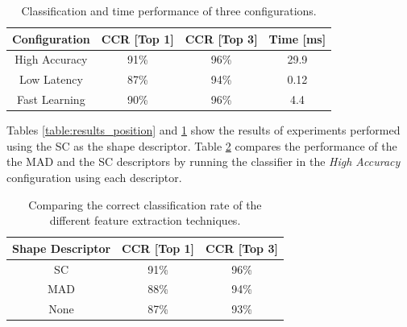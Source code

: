 \begin{table}
\centering
\renewcommand{\arraystretch}{1.2}
\begin{tabular}{ | c | c | c | c |}
  \hline
  \textbf{Configuration}  & \textbf{CCR [Top 1]}  & \textbf{CCR [Top 3]} & \textbf{Time [ms]}\\
  \hline
  High Accuracy & 91\% & 96\% & 29.9 \\ 
  \hline
  Low Latency   & 87\% & 94\% & 0.12 \\
  \hline
  Fast Learning & 90\% & 96\% & 4.4 \\ 
  \hline
\end{tabular}
\caption{Classification and time performance of three configurations.}
\label{table:configurations} 
\end{table}

Tables \ref{table:results_position} and \ref{table:configurations} show the results of experiments performed using the SC as the shape descriptor.
Table \ref{table:features_comparison} compares the performance of the the MAD and the SC descriptors by running the classifier in the \emph{High Accuracy} configuration using each descriptor.

\begin{table}
\centering
\renewcommand{\arraystretch}{1.2}
\begin{tabular}{ | c | c | c |}
\hline
	\textbf{Shape Descriptor}  & \textbf{CCR [Top 1]}  & \textbf{CCR [Top 3]} \\
	\hline 
	SC      & 91\% & 96\%  \\                
  	\hline
  	MAD     & 88\% & 94\% \\
  	\hline
  	None    & 87\% & 93\% \\
  	\hline
\end{tabular}
\caption{Comparing the correct classification rate of the different feature extraction techniques.}
\label{table:features_comparison} 
\end{table}


%
%
%
